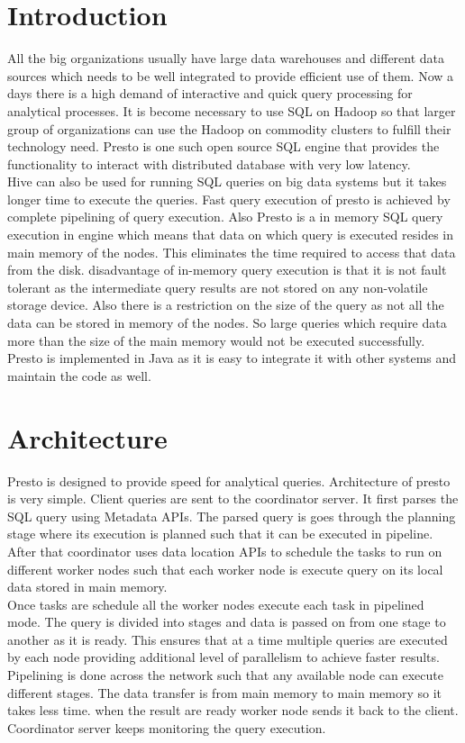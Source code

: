 \section{Introduction}
All the big organizations usually have large data warehouses and different data sources which needs to be well integrated to provide efficient use of them. Now a days there is a high demand of interactive and quick query processing for analytical processes. It is become necessary to use SQL on Hadoop so that larger group of organizations can use the Hadoop on commodity clusters to fulfill their technology need. Presto is one such open source SQL engine that provides the functionality to interact with distributed database with very low latency.\\
Hive can also be used for running SQL queries on big data systems but it takes longer time to execute the queries. Fast query execution of presto is achieved by complete pipelining of query execution. Also Presto is a in memory SQL query execution in engine which means that data on which query is executed resides in main memory of the nodes. This eliminates the time required to access that data from the disk. disadvantage of in-memory query execution is that it is not fault tolerant as the intermediate query results are not stored on any non-volatile storage device. Also there is a restriction on the size of the query as not all the data can be stored in memory of the nodes. So large queries which require data more than the size of the main memory would not be executed successfully.\\
Presto is implemented in Java as it is easy to integrate it with other systems and maintain the code as well.

\section{Architecture}
Presto is designed to provide speed for analytical queries. Architecture of presto is very simple. Client queries are sent to the coordinator server. It first parses the SQL query using Metadata APIs. The parsed query is goes through the planning stage where its execution is planned such that it can be executed in pipeline. After that coordinator uses data location APIs to schedule the tasks to run on different worker nodes such that each worker node is execute query on its local data stored in main memory. \\
Once tasks are schedule all the worker nodes execute each task in pipelined mode. The query is divided into stages and data is passed on from one stage to another as it is ready. This ensures that at a time multiple queries are executed by each node providing additional level of parallelism to achieve faster results. Pipelining is done across the network such that any available node can execute different stages. The data transfer is from main memory to main memory so it takes less time. when the result are ready worker node sends it back to the client. Coordinator server keeps monitoring the query execution. 


